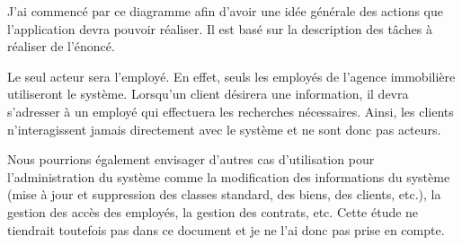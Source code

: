 J'ai commencé par ce diagramme afin d'avoir une idée générale des actions que l'application devra pouvoir réaliser. Il est basé sur la description des tâches à réaliser de l'énoncé.

Le seul acteur sera l'employé. En effet, seuls les employés de l'agence immobilière utiliseront le système. Lorsqu'un client désirera une information, il devra s'adresser à un employé qui effectuera les recherches nécessaires. Ainsi, les clients n'interagissent jamais directement avec le système et ne sont donc pas acteurs.

Nous pourrions également envisager d'autres cas d'utilisation pour l'administration du système comme la modification des informations du système (mise à jour et suppression des classes standard, des biens, des clients, etc.), la gestion des accès des employés, la gestion des contrats, etc. Cette étude ne tiendrait toutefois pas dans ce document et je ne l'ai donc pas prise en compte.